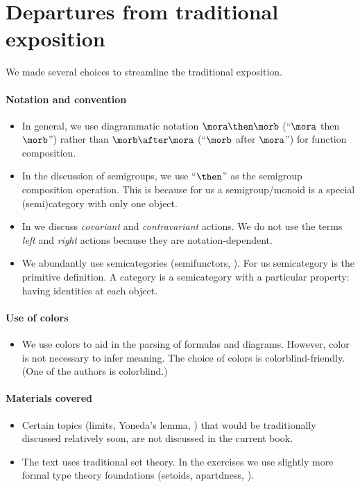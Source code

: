 
\section{Departures from traditional exposition}

We made several choices to streamline the traditional exposition.

\paragraph{Notation and convention}
\begin{itemize}
    \item In general, we use diagrammatic notation $\mora \then \morb$ (``$\mora$ then $\morb$'') rather than $\morb \after \mora$ (``$\morb$ after $\mora$'') for function composition.
    \item In the discussion of semigroups, we use ``$\then$'' as the semigroup composition operation.
    This is because for us a semigroup/monoid is a special (semi)category with only one object.
    \item In  we discuss \emph{covariant} and \emph{contravariant} actions.
    We do not use the terms \emph{left} and \emph{right} actions because they are notation-dependent.
    \item We abundantly use semicategories (semifunctors, \etc).
    For us semicategory is the primitive definition.
    A category is a semicategory with a particular property: having identities at each object.
\end{itemize}

\paragraph{Use of colors}
\begin{itemize}
    \item We use colors to aid in the parsing of formulas and diagrams.
    However, color is not necessary to infer meaning.
    The choice of colors is colorblind-friendly.
    (One of the authors is colorblind.)
\end{itemize}

\paragraph{Materials covered}
\begin{itemize}
    \item Certain topics (limits, Yoneda's lemma, \etc) that would be traditionally discussed relatively soon, are not discussed in the current book.
    \item The text uses traditional set theory.
    In the exercises we use slightly more formal type theory foundations (setoids, apartdness, \etc).

\end{itemize}

